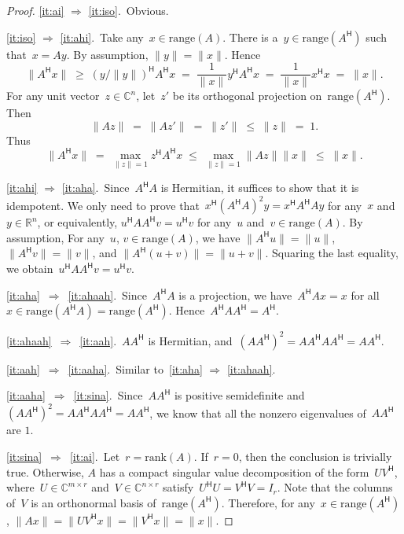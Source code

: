 \documentclass[11pt,a4paper]{article}  %
\numberwithin{equation}{section}
\theoremstyle{definition}
\def\RR{\mathbb{R}}
\def\CC{\mathbb{C}}
\newcommand{\hmt}{{\scriptscriptstyle{{\mathsf{H}}}}}
\newcommand{\rank}{\mathrm{rank}}
\newcommand{\range}{\mathrm{range}}
\begin{document}
\begin{proof}
  \ref{it:ai} $\Rightarrow $ \ref{it:iso}.~Obvious.

  \ref{it:iso} $\Rightarrow $ \ref{it:ahi}.~Take any~$x\in \range(A)$.
  There is a~$y \in \range(A^\hmt)$ such that~$x=Ay$. By assumption, $\|y\|=\|x\|$. Hence
    \begin{equation*}
      \|A^\hmt x\| \;\ge\; (y/\|y\|)^\hmt A^\hmt x \;=\; \frac{1}{\|x\|} y^\hmt A^\hmt x \;=\;
      \frac{1}{\|x\|} x^\hmt x\;=\; \|x\|.
    \end{equation*}
  For any unit vector~$z\in\CC^{n}$, let~$z'$ be its orthogonal projection on~$\range(A^\hmt)$.
  Then
  \begin{equation*}
  \|Az\|\;=\;\|Az'\|\;=\;\|z'\|\;\le\;\|z\|\;=\;1.
  \end{equation*}
  Thus
    \begin{equation*}
      \|A^\hmt x\| \;=\; \max_{\|z\|=1}z^\hmt A^\hmt x
      \;\le\; \max_{\|z\|=1}\|Az\|\|x\| \;\le\; \|x\|.
    \end{equation*}

    \ref{it:ahi} $\Rightarrow $ \ref{it:aha}.~Since~$A^\hmt A$ is Hermitian, it suffices to show that it is idempotent. We
      only need to prove that~$x^\hmt(A^\hmt A)^2y=x^\hmt A^\hmt Ay$ for any~$x$ and~$y\in \RR^n$,
      or equivalently, $u^\hmt A A^\hmt v=u^\hmt v$ for  any~$u$ and~$v\in \range(A)$. By
      assumption,
      For any~$u$, $v\in\range(A)$, we have $\|A^\hmt u\|=\|u\|$, $\|A^\hmt v\|=\|v\|$, and
      $\|A^\hmt (u+v)\| = \|u+v\|$. Squaring the last equality, we obtain~$u^\hmt AA^\hmt v = u^\hmt
      v$.

      \ref{it:aha}~$\Rightarrow$~\ref{it:ahaah}.~Since~$A^\hmt A$ is a projection, we have~$A^\hmt A x = x$ for all~$x\in \range(A^\hmt A)
    = \range(A^\hmt)$. Hence~$A^\hmt AA^\hmt = A^\hmt$.

    \ref{it:ahaah}~$\Rightarrow$~\ref{it:aah}.~$AA^\hmt$ is Hermitian, and~$(AA^\hmt)^2=AA^\hmt AA^\hmt = AA^\hmt$.

    \ref{it:aah}~$\Rightarrow$~\ref{it:aaha}.~Similar to~\ref{it:aha} $\Rightarrow$ \ref{it:ahaah}.

    \ref{it:aaha}~$\Rightarrow$~\ref{it:sina}.~Since~$AA^\hmt$ is positive semidefinite
    and~$(AA^\hmt)^2=AA^\hmt AA^\hmt =AA^\hmt$, we know that all the nonzero eigenvalues of~$AA^\hmt$ are $1$.

    \ref{it:sina}~$\Rightarrow$~\ref{it:ai}.~Let~$r=\rank(A)$. If~$r = 0$, then the conclusion is trivially true.
       Otherwise, $A$ has a compact singular value decomposition of the form~$UV^\hmt$,
       where~$U\in\CC^{m\times r}$ and~$V\in\CC^{n\times r}$ satisfy~$U^\hmt U = V^\hmt V = I_r$.
       Note that the columns of~$V$ is an orthonormal basis of~$\range(A^\hmt)$.
       Therefore, for any~$x\in \range(A^\hmt)$,
         $\|A x\|= \|UV^\hmt x\| = \|V^\hmt x\| = \|x\|$.
\end{proof}
\end{document}
